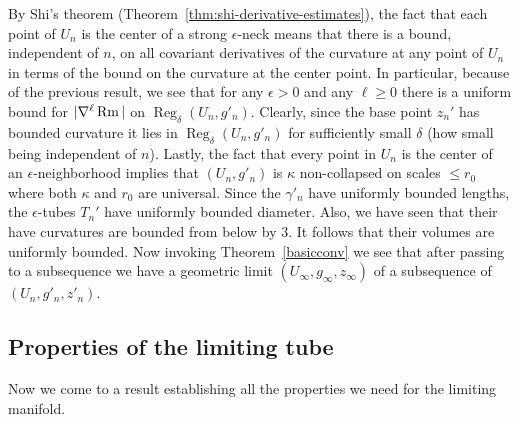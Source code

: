 By Shi's theorem (Theorem~\ref{thm:shi-derivative-estimates}), the fact that each point of
$U_n$ is the center of a strong $\epsilon$-neck means that there is
a bound, independent of $n$, on all covariant derivatives of the
curvature at any point of $U_n$ in terms of the bound on the
curvature at the center point. In particular, because of the
previous result, we see that for any $\epsilon>0$ and any $\ell\ge
0$ there is a uniform bound for $|\nabla^\ell \operatorname{Rm}|$ on
$\operatorname{Reg}_\delta(U_n,g'_n)$. Clearly, since the base point $z_n'$ has
bounded curvature it lies in $\operatorname{Reg}_\delta(U_n,g'_n)$ for
sufficiently small $\delta$ (how small being independent of $n$).
Lastly, the fact that every point in $U_n$ is the center of an
$\epsilon$-neighborhood implies that $(U_n,g'_n)$ is $\kappa$
non-collapsed on scales $\le r_0$ where both $\kappa$ and $r_0$ are
universal. Since the $\gamma'_n$ have uniformly bounded lengths, the
$\epsilon$-tubes $T_n'$ have uniformly bounded diameter. Also, we
have seen that their have curvatures are bounded from below by $3$.
It follows that their volumes are uniformly bounded. Now invoking
Theorem~\ref{basicconv} we see that after passing to a subsequence
we have a geometric limit $(U_\infty,g_\infty,z_\infty)$ of a
subsequence of $(U_n,g'_n,z'_n)$.


\subsection{Properties of the limiting tube}


Now we come to a result establishing all the properties we need for
the limiting manifold.



